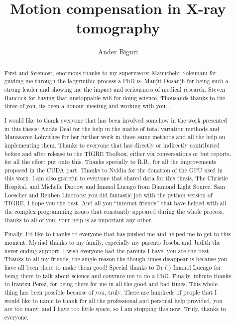 \documentclass[11pt]{report}
\title{Motion compensation in X-ray tomography}
\author{Ander Biguri}
\begin{document}
\maketitle





\tableofcontents
\listoffigures
\listoftables


\renewcommand{\abstractname}{Acknowledgements}
\begin{abstract}
First and foremost, enormous thanks to my supervisors:  Manuchehr Soleimani for guiding me through the labyrinthic process a PhD is. Manjit Dosanjh for being such a strong leader and showing me the impact and seriousness of medical research. Steven Hancock for having that unstoppable will for doing science. Thousands thanks to the three of you, its been a honour meeting and working with you, .

I would like to thank everyone that has been involved somehow in the work presented in this thesis: And\'as De\'al for the help in the maths of total variation methods and Manasavee Lohvithee for her further work in these same methods and all the help on implementing them. Thanks to everyone that has directly or indirectly contributed before and after release to the TIGRE Toolbox, either via conversations or but reports, for all the effort put onto this. Thanks specially to R.B., for all the improvements proposed in the CUDA part. Thanks to Nvidia for the donation of the GPU used in this work. I am also grateful to everyone that shared data for this thesis, The Christie Hospital, and Michelle Darrow and Imanol Luengo from Diamond Light Source. Sam Loescher and Reuben Lindroos: you did fantastic job with the python version of TIGRE, I hope you the best. And all you ``internet friends'' that have helped with all the complex programming issues that constantly appeared during the whole process, thanks to all of you, your help is as important any other.

Finally, I'd like to thanks to everyone that has pushed me and helped me to get to this moment. Myriad thanks to my family, especially my parents Joseba and Judith the never ending support. I wish everyone had the parents I have, you are the best. Thanks to all my friends, the single reason the though times disappear is because you have all been there to make them good! Special thanks to Dr (!) Imanol Luengo for being there to talk about science and convince me to do a PhD. Finally, infinite thanks to Irantzu Perez, for being there for me in all the good and bad times. This whole thing has been possible because of you, truly. There are hundreds of people that I would like to name to thank for all the professional and personal help provided, you are too many, and I have too little space, so I am stopping this now. Truly, thanks to everyone.


\end{abstract}
\end{document}
